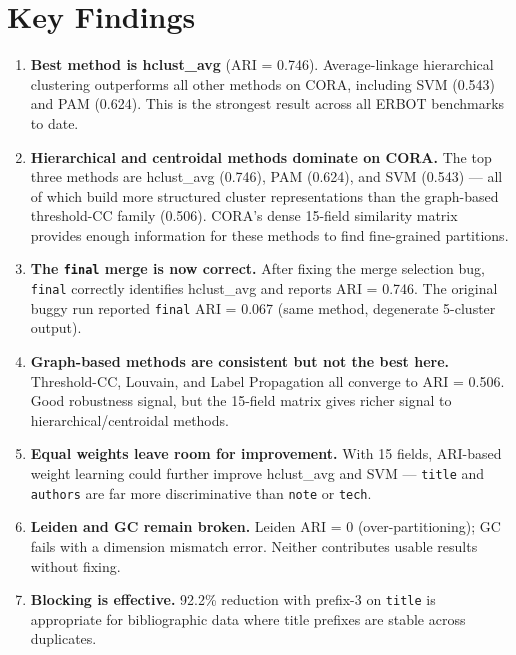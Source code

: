 \documentclass[11pt, a4paper]{article}
\begin{document}
\section{Key Findings}

\begin{enumerate}[leftmargin=*, label=\arabic*.]
  \item \textbf{Best method is hclust\_avg} (ARI = 0.746). Average-linkage hierarchical clustering
        outperforms all other methods on CORA, including SVM (0.543) and PAM (0.624). This is the
        strongest result across all ERBOT benchmarks to date.

  \item \textbf{Hierarchical and centroidal methods dominate on CORA.} The top three methods are
        hclust\_avg (0.746), PAM (0.624), and SVM (0.543) --- all of which build more structured
        cluster representations than the graph-based threshold-CC family (0.506). CORA's dense
        15-field similarity matrix provides enough information for these methods to find fine-grained
        partitions.

  \item \textbf{The \texttt{final} merge is now correct.} After fixing the merge selection bug,
        \texttt{final} correctly identifies hclust\_avg and reports ARI = 0.746. The original buggy
        run reported \texttt{final} ARI = 0.067 (same method, degenerate 5-cluster output).

  \item \textbf{Graph-based methods are consistent but not the best here.} Threshold-CC, Louvain,
        and Label Propagation all converge to ARI = 0.506. Good robustness signal, but the 15-field
        matrix gives richer signal to hierarchical/centroidal methods.

  \item \textbf{Equal weights leave room for improvement.} With 15 fields, ARI-based weight learning
        could further improve hclust\_avg and SVM --- \texttt{title} and \texttt{authors} are far
        more discriminative than \texttt{note} or \texttt{tech}.

  \item \textbf{Leiden and GC remain broken.} Leiden ARI = 0 (over-partitioning); GC fails with a
        dimension mismatch error. Neither contributes usable results without fixing.

  \item \textbf{Blocking is effective.} 92.2\% reduction with prefix-3 on \texttt{title} is
        appropriate for bibliographic data where title prefixes are stable across duplicates.
\end{enumerate}
\end{document}
